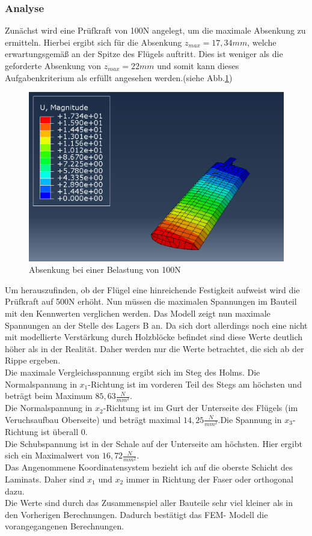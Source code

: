 \subsubsection{Analyse}
Zunächst wird eine Prüfkraft von 100N angelegt, um die maximale Absenkung zu ermitteln. Hierbei ergibt sich für die Absenkung $z_{max}=17,34mm$, welche erwartungsgemäß an der Spitze des Flügels auftritt. Dies ist weniger als die geforderte Absenkung von $z_{max}=22mm$ und somit kann dieses Aufgabenkriterium als erfüllt angesehen werden.(siehe Abb.\ref{Absenkung})
\begin{figure}[h]
 \centering
 \includegraphics[scale=0.4]{Bilder/Absenkung_100N}
 \caption{Absenkung bei einer Belastung von 100N}
 \label{Absenkung}
\end{figure}
\newpage
\noindent
Um herauszufinden, ob der Flügel eine hinreichende Festigkeit aufweist wird die Prüfkraft auf 500N erhöht. Nun müssen die maximalen Spannungen im Bauteil mit den Kennwerten verglichen werden. Das Modell zeigt nun maximale Spannungen an der Stelle des Lagers B an. Da sich dort allerdings noch eine nicht mit modellierte Verstärkung durch Holzblöcke befindet sind diese Werte deutlich höher als in der Realität. Daher werden nur die Werte betrachtet, die sich ab der Rippe ergeben.\\
Die maximale Vergleichsspannung ergibt sich im Steg des Holms. Die Normalspannung in $x_{1}$-Richtung ist im vorderen Teil des Stegs am höchsten und beträgt beim Maximum $85,63\frac{N}{mm^2}$.\\
Die Normalspannung in $x_{2}$-Richtung ist im Gurt der Unterseite des Flügels (im Veruchsaufbau Oberseite) und beträgt maximal $14,25\frac{N}{mm^2}$.Die Spannung in $x_{3}$-Richtung ist überall 0.\\
Die Schubspannung ist in der Schale auf der Unterseite am höchsten. Hier ergibt sich ein Maximalwert von $16,72\frac{N}{mm^2}$.\\
\noindent
Das Angenommene Koordinatensystem bezieht ich auf die oberste Schicht des Laminats. Daher sind $x_{1}$ und $x_{2}$ immer in Richtung der Faser oder orthogonal dazu.\\
Die Werte sind durch das Zusammenspiel aller Bauteile sehr viel kleiner als in den Vorherigen Berechnungen. Dadurch bestätigt das FEM- Modell die vorangegangenen Berechnungen.
\newpage
